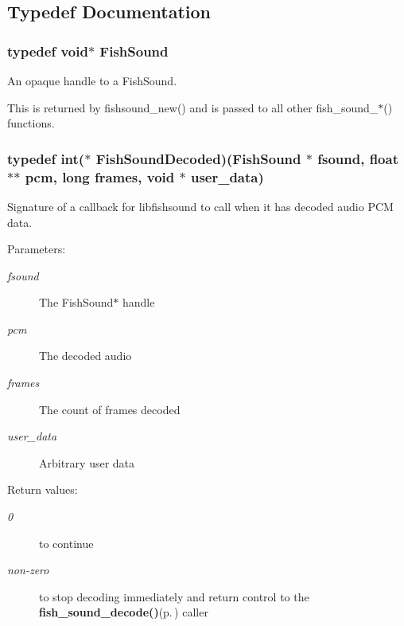 \subsection{Typedef Documentation}
\subsubsection{\setlength{\rightskip}{0pt plus 5cm}typedef void$\ast$ {\bf Fish\-Sound}}\label{fishsound_8h_a0}


An opaque handle to a Fish\-Sound. 

This is returned by fishsound\_\-new() and is passed to all other fish\_\-sound\_\-$\ast$() functions. 
\subsubsection{\setlength{\rightskip}{0pt plus 5cm}typedef int($\ast$ {\bf Fish\-Sound\-Decoded})({\bf Fish\-Sound} $\ast$ fsound, float $\ast$$\ast$ pcm, long frames, void $\ast$ user\_\-data)}\label{fishsound_8h_a1}


Signature of a callback for libfishsound to call when it has decoded audio PCM data. 

\begin{Desc}
\item[Parameters:]
\begin{description}
\item[{\em fsound}]The Fish\-Sound$\ast$ handle \item[{\em pcm}]The decoded audio \item[{\em frames}]The count of frames decoded \item[{\em user\_\-data}]Arbitrary user data \end{description}
\end{Desc}
\begin{Desc}
\item[Return values:]
\begin{description}
\item[{\em 0}]to continue \item[{\em non-zero}]to stop decoding immediately and return control to the {\bf fish\_\-sound\_\-decode()}{\rm (p.\,\pageref{fishsound_8h_a7})} caller \end{description}
\end{Desc}
